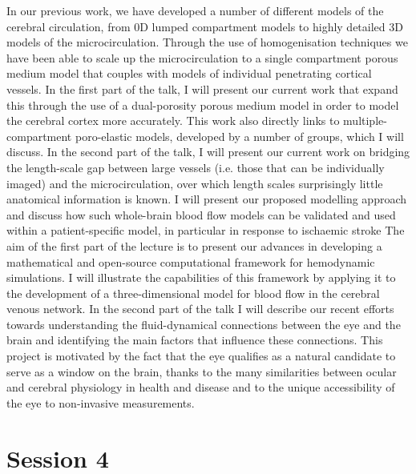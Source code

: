 \documentclass{article}
\begin{document}
{
In our previous work, we have developed a number of different models of the cerebral circulation, from 0D lumped compartment models to highly detailed 3D models of the microcirculation. Through the use of homogenisation techniques we have been able to scale up the microcirculation to a single compartment porous medium model that couples with models of individual penetrating cortical vessels. In the first part of the talk, I will present our current work that expand this through the use of a dual-porosity porous medium model in order to model the cerebral cortex more accurately. This work also directly links to multiple-compartment poro-elastic models, developed by a number of groups, which I will discuss. In the second part of the talk, I will present our current work on bridging the length-scale gap between large vessels (i.e. those that can be individually imaged) and the microcirculation, over which length scales surprisingly little anatomical information is known. I will present our proposed modelling approach and discuss how such whole-brain blood flow models can be validated and used within a patient-specific model, in particular in response to ischaemic stroke
}
{
The aim of the first part of the lecture is to present our advances in
developing a mathematical and open-source computational framework for 
hemodynamic simulations. I will illustrate the capabilities of this 
framework by applying it to the development of a three-dimensional 
model for blood flow in the cerebral venous network. In the second 
part of the talk I will describe our recent efforts towards 
understanding the fluid-dynamical connections between the eye and the 
brain and identifying the main factors that influence these 
connections. This project is motivated by the fact that the eye 
qualifies as a natural candidate to serve as a window on the brain, 
thanks to the many similarities between ocular and cerebral physiology 
in health and disease and to the unique accessibility of the eye to 
non-invasive measurements.
}

\section*{Session 4}
\end{document}
